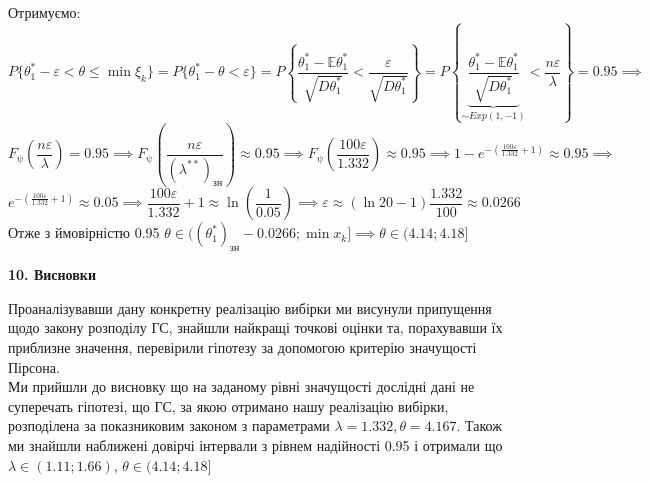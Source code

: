 \documentclass[11 pt]{article}
\begin{document}
Отримуємо:
$$ 
P \{  \theta^*_1 - \varepsilon < \theta \leq \min \xi_k  \} = 
P \{  \theta^*_1 - \theta < \varepsilon  \} = 
P \left\{  \frac{\theta^*_1 - \mathbb{E} \theta^*_1}{ \sqrt{D \theta^*_1} } < \frac{\varepsilon}{ \sqrt{D \theta^*_1} }   \right\}=
P \left\{ \underbrace{ \frac{\theta^*_1 - \mathbb{E} \theta^*_1}{ \sqrt{D \theta^*_1} }}_{\sim Exp(1,-1)} < \frac{n \varepsilon}{ \lambda }   \right\}
=0.95 \implies
$$ 
$$ 
F_{\uppsi} \left(\frac{n\varepsilon}{\lambda}\right) = 0.95 \implies
F_{\uppsi} \left(\frac{n\varepsilon}{(\lambda^{**})_{\text{зн}}}\right) \approx 0.95
\implies
F_{\uppsi} \left(\frac{100\varepsilon}{1.332}\right) \approx 0.95 \implies
1-e^{-\left(\frac{100\varepsilon}{1.332} +1\right)} \approx 0.95
\implies
$$ 
$$
e^{-\left(\frac{100\varepsilon}{1.332} +1\right)} \approx 0.05 \implies
\frac{100\varepsilon}{1.332} +1\approx \ln(\frac{1}{0.05}) \implies
\varepsilon \approx (\ln{20} - 1)\frac{1.332}{100} \approx 0.0266
$$
Отже з ймовірністю 0.95 $\theta \in ((\theta^*_1)_\text{зн}-0.0266;\min x_k] \implies
\theta \in (4.14; 4.18]$ 



\begin{center}
    \large
    \textbf{10. Висновки}
\end{center}
Проаналізувавши дану конкретну реалізацію вибірки ми висунули припущення щодо
закону розподілу ГС, знайшли найкращі точкові оцінки та, порахувавши їх приблизне значення, 
перевірили гіпотезу за допомогою критерію значущості Пірсона. \\ 
Ми прийшли до висновку що на заданому рівні значущості дослідні дані не суперечать гіпотезі, що 
ГС, за якою отримано нашу реалізацію вибірки, розподілена за показниковим законом
з параметрами $\lambda=1.332, \theta=4.167$. Також ми знайшли наближені довірчі інтервали
з рівнем надійності 0.95 і отримали що $\lambda \in (1.11; 1.66)$, $\theta \in (4.14; 4.18]$ 



















\newpage
\end{document}

